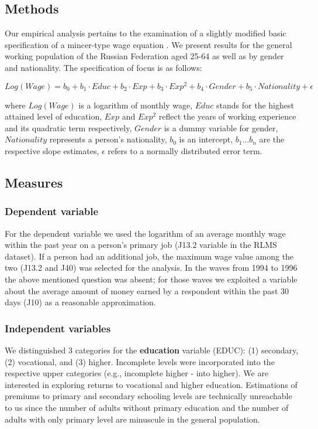 \documentclass[12pt,a4paper]{article}
\begin{document}
\subsection*{Methods}

Our empirical analysis pertains to the examination of a slightly modified basic specification of a mincer-type wage equation \parencite{mincer_082._1974}. We present results for the general working population of the Russian Federation aged 25-64 as well as by gender and nationality. The specification of focus is as follows:

$$Log(Wage) = b_0 + b_1\cdot Educ + b_2\cdot Exp + b_3\cdot Exp^2 + b_4\cdot Gender + b_5\cdot Nationality + \epsilon$$

where $Log(Wage)$ is a logarithm of monthly wage, $Educ$ stands for the highest attained level of education, $Exp$ and $Exp^2$ reflect the years of working experience and its quadratic term respectively, $Gender$ is a dummy variable for gender, $Nationality$ represents a person's nationality, $b_0$ is an intercept, $b_1 ... b_n$ are the respective slope estimates, $\epsilon$ refers to a normally distributed error term.
\\

\subsection*{Measures}

\subsubsection*{Dependent variable}

For the dependent variable we used the logarithm of an average monthly wage within the past year on a person's primary job (J13.2 variable in the RLMS dataset). If a person had an additional job, the maximum wage value among the two (J13.2 and J40) was selected for the analysis. In the waves from 1994 to 1996 the above mentioned question was absent; for those waves we exploited a variable about the average amount of money earned by a respondent within the past 30 days (J10) as a reasonable approximation.
\\

\subsubsection*{Independent variables}

We distinguished 3 categories for the {\bf education} variable (EDUC): (1) secondary, (2) vocational, and (3) higher. Incomplete levels were incorporated into the respective upper categories (e.g., incomplete higher - into higher). We are interested in exploring returns to vocational and higher education. Estimations of premiums to primary and secondary schooling levels are technically unreachable to us since the number of adults without primary education and the number of adults with only primary level are minuscule in the general population. 
\\
\end{document}
